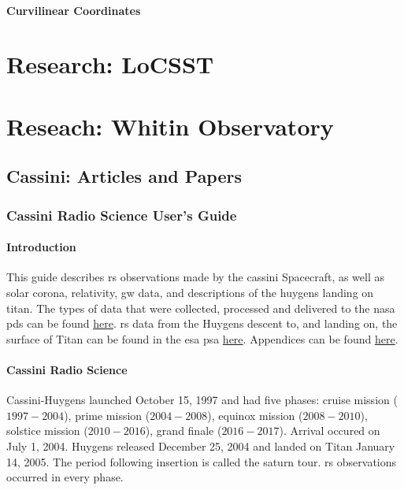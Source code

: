\documentclass[oneside]{book}
\theoremstyle{mystyle}
\begin{document}
\subsection{Curvilinear Coordinates}
\part{Research: LoCSST}
\part{Reseach: Whitin Observatory}
\chapter{Cassini: Articles and Papers}
\section{Cassini Radio Science User's Guide}
\label{sec:usrguide}
\subsection{Introduction}
This guide describes \gls{rs} observations made by the \gls{cassini} Spacecraft, as well as \gls{solar corona}, \gls{relativity}, \gls{gw} data, and descriptions of the \gls{huygens} landing on \gls{titan}. The types of data that were collected, processed and delivered to the \gls{nasa} \gls{pds} can be found \href{http://pds-atmospheres.nmsu.edu/}{here}. \gls{rs} data from the Huygens descent to, and landing on, the surface of Titan can be found in the \gls{esa} \gls{psa} \href{https://www.cosmos.esa.int/?project=PSA&page=huygens}{here}. Appendices can be found \href{https://radioscience.jpl.nasa.gov/publications/index.html}{here}.
\subsection{Cassini Radio Science\label{subsec:usr_cassini_radio_science}}
Cassini-Huygens launched October 15, 1997 and had five phases: \Gls{cruise mission} ($1997\! -\! 2004$), \gls{prime mission} ($2004\! -\! 2008$), \gls{equinox mission} ($2008\! -\! 2010$), \gls{solstice mission} ($2010\! -\! 2016$), \gls{grand finale} ($2016\! - \!2017$). Arrival occured on July 1, 2004. Huygens released December 25, 2004 and landed on Titan January 14, 2005. The period following insertion is called the \gls{saturn tour}. \gls{rs} observations occurred in every phase.
\end{document}
